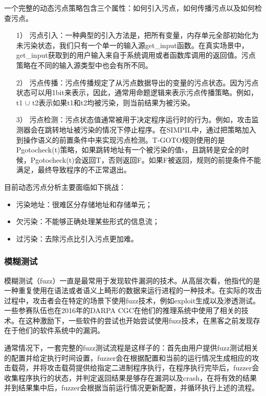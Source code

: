 \documentclass[doctor,privacy,twoside]{buaa_mac}
\begin{document}
一个完整的动态污点策略包含三个属性：如何引入污点，如何传播污点以及如何检查污点。
\begin{itemize}
\item[1）] 污点引入：一种典型的引入方法是，把所有变量，内存单元全部初始化为未污染状态，我们只有一个单一的输入源get\_{}input函数。在真实场景中，get\_{}input获取到的用户输入来自于系统调用或者函数库调用的返回值。污点策略在不同的输入源类型中也会有所不同。
\item[2）] 污点传播：污点传播规定了从污点数据导出的变量的污点状态。因为污点状态可以用1bit来表示，因此，通常用命题逻辑来表示污点传播策略。例如，t1 $\cup$ t2表示如果t1和t2均被污染，则当前结果为被污染。
\item[3）] 污点检测：污点状态值通常被用于决定程序运行时的行为。例如，攻击监测器会在跳转地址被污染的情况下停止程序。在SIMPIL中，通过把策略加入到操作语义的前置条件中来实现污点检测。T-GOTO规则使用的是Pgotocheck(t)策略，如果跳转地址有一个被污染的值t，且跳转是安全的时候，Pgotocheck(t)会返回T，否则返回F。如果F被返回，规则的前提条件不能满足，最终导致程序的不正常退出。
\end{itemize}

目前动态污点分析主要面临如下挑战：
\begin{itemize}
\item 污染地址：很难区分存储地址和存储单元；
\item 欠污染：不能够正确处理某些形式的信息流；
\item 过污染：去除污点比引入污点更加难。
\end{itemize}


\subsubsection{模糊测试}

模糊测试（fuzz）一直是最常用于发现软件漏洞的技术。从高层次看，他指代的是一种重复使用在语法或者语义上畸形的数据来运行进程的一种技术。在实际的攻击过程中，攻击者会在特定的场景下使用fuzz技术，例如exploit生成以及渗透测试。一些参赛队伍也在2016年的DARPA CGC在他们的推理系统中使用了相关的技术。在这种激励下，一些软件的尝试也开始尝试使用fuzz技术，在黑客之前发现存在于他们的软件系统中的漏洞。

通常情况下，一套完整的fuzz测试流程是这样子的：首先由用户提供fuzz测试相关的配置并给定执行时间设置，fuzzer会在根据配置和当前的运行情况生成相应的攻击载荷，并将攻击载荷提供给指定二进制程序执行，在程序执行完毕后，fuzzer会收集程序执行的状态，并判定返回结果是够存在漏洞以及crash，在将有效的结果并到结果集中后，fuzzer会根据当前运行情况更新配置，并循环执行上述的流程。
\end{document}
